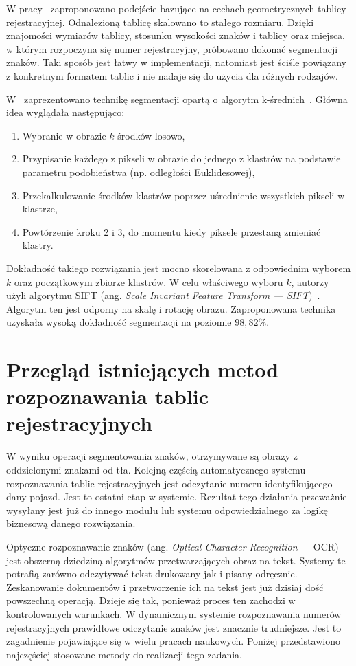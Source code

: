 W pracy~\cite{1381137} zaproponowano podejście bazujące na cechach geometrycznych tablicy rejestracyjnej.
Odnalezioną tablicę skalowano to stałego rozmiaru.
Dzięki znajomości wymiarów tablicy, stosunku wysokości znaków i tablicy oraz miejsca, w którym rozpoczyna się numer rejestracyjny, próbowano dokonać segmentacji znaków.
Taki sposób jest łatwy w implementacji, natomiast jest ściśle powiązany z konkretnym formatem tablic i nie nadaje się do użycia dla różnych rodzajów.

W~\cite{segmentation_kmeans} zaprezentowano technikę segmentacji opartą o algorytm k-średnich~\cite{1017616}.
Główna idea wyglądała następująco:
\begin{enumerate}
    \item Wybranie w obrazie $k$ środków losowo,
    \item Przypisanie każdego z pikseli w obrazie do jednego z klastrów na podstawie parametru podobieństwa (np. odległości Euklidesowej),
    \item Przekalkulowanie środków klastrów poprzez uśrednienie wszystkich pikseli w klastrze,
    \item Powtórzenie kroku 2 i 3, do momentu kiedy piksele przestaną zmieniać klastry.
\end{enumerate}
Dokładność takiego rozwiązania jest mocno skorelowana z odpowiednim wyborem $k$ oraz początkowym zbiorze klastrów.
W celu właściwego wyboru $k$, autorzy użyli algorytmu SIFT (ang. \textit{Scale Invariant Feature Transform --- SIFT})~\cite{sift}.
Algorytm ten jest odporny na skalę i rotację obrazu.
Zaproponowana technika uzyskała wysoką dokładność segmentacji na poziomie $98,82\%$.


\section{Przegląd istniejących metod rozpoznawania tablic rejestracyjnych}
W wyniku operacji segmentowania znaków, otrzymywane są obrazy z oddzielonymi znakami od tła.
Kolejną częścią automatycznego systemu rozpoznawania tablic rejestracyjnych jest odczytanie numeru identyfikującego dany pojazd.
Jest to ostatni etap w systemie.
Rezultat tego działania przeważnie wysyłany jest już do innego modułu lub systemu odpowiedzialnego za logikę biznesową danego rozwiązania.

Optyczne rozpoznawanie znaków (ang. \textit{Optical Character Recognition} --- OCR) jest obszerną dziedziną algorytmów przetwarzających obraz na tekst.
Systemy te potrafią zarówno odczytywać tekst drukowany jak i pisany odręcznie.
Zeskanowanie dokumentów i przetworzenie ich na tekst jest już dzisiaj dość powszechną operacją.
Dzieje się tak, ponieważ proces ten zachodzi w kontrolowanych warunkach.
W dynamicznym systemie rozpoznawania numerów rejestracyjnych prawidłowe odczytanie znaków jest znacznie trudniejsze.
Jest to zagadnienie pojawiające się w wielu pracach naukowych.
Poniżej przedstawiono najczęściej stosowane metody do realizacji tego zadania.

